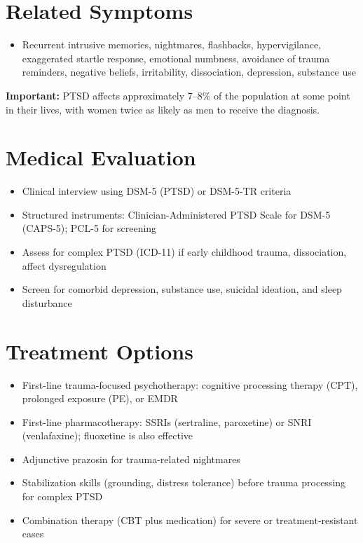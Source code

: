 \section*{Related Symptoms}
\begin{itemize}
  \item Recurrent intrusive memories, nightmares, flashbacks, hypervigilance, exaggerated startle response, emotional numbness, avoidance of trauma reminders, negative beliefs, irritability, dissociation, depression, substance use
\end{itemize}
\textbf{Important:} PTSD affects approximately 7--8\% of the population at some point in their lives, with women twice as likely as men to receive the diagnosis.

\section*{Medical Evaluation}
\begin{itemize}
  \item Clinical interview using DSM-5 (PTSD) or DSM-5-TR criteria
  \item Structured instruments: Clinician-Administered PTSD Scale for DSM-5 (CAPS-5); PCL-5 for screening
  \item Assess for complex PTSD (ICD-11) if early childhood trauma, dissociation, affect dysregulation
  \item Screen for comorbid depression, substance use, suicidal ideation, and sleep disturbance
\end{itemize}

\section*{Treatment Options}
\begin{itemize}
  \item First-line trauma-focused psychotherapy: cognitive processing therapy (CPT), prolonged exposure (PE), or EMDR
  \item First-line pharmacotherapy: SSRIs (sertraline, paroxetine) or SNRI (venlafaxine); fluoxetine is also effective
  \item Adjunctive prazosin for trauma-related nightmares
  \item Stabilization skills (grounding, distress tolerance) before trauma processing for complex PTSD
  \item Combination therapy (CBT plus medication) for severe or treatment-resistant cases
\end{itemize}

